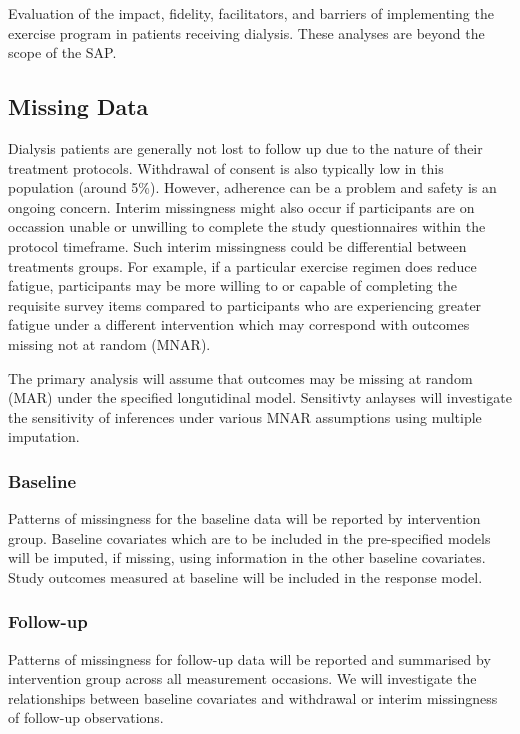 \documentclass[
]{article}
\begin{document}
Evaluation of the impact, fidelity, facilitators, and barriers of implementing the exercise program in patients receiving dialysis.
These analyses are beyond the scope of the SAP.


\hypertarget{missing-data}{%
\subsection{Missing Data}\label{missing-data}}

Dialysis patients are generally not lost to follow up due to the nature of their treatment protocols.
Withdrawal of consent is also typically low in this population (around 5\%).
However, adherence can be a problem and safety is an ongoing concern.
Interim missingness might also occur if participants are on occassion unable or unwilling to complete the study questionnaires within the protocol timeframe.
Such interim missingness could be differential between treatments groups.
For example, if a particular exercise regimen does reduce fatigue, participants may be more willing to or capable of completing the requisite survey items compared 
to participants who are experiencing greater fatigue under a different intervention which may correspond with outcomes missing not at random (MNAR).

The primary analysis will assume that outcomes may be missing at random (MAR) under the specified longutidinal model.
Sensitivty anlayses will investigate the sensitivity of inferences under various MNAR assumptions using multiple imputation. 

\subsubsection{Baseline}

Patterns of missingness for the baseline data will be reported by intervention group.
Baseline covariates which are to be included in the pre-specified models will be imputed, if missing, using information in the other baseline covariates.
Study outcomes measured at baseline will be included in the response model.


\subsubsection{Follow-up}

Patterns of missingness for follow-up data will be reported and summarised by intervention group across all measurement occasions.
We will investigate the relationships between baseline covariates and withdrawal or interim missingness of follow-up observations.
\end{document}
